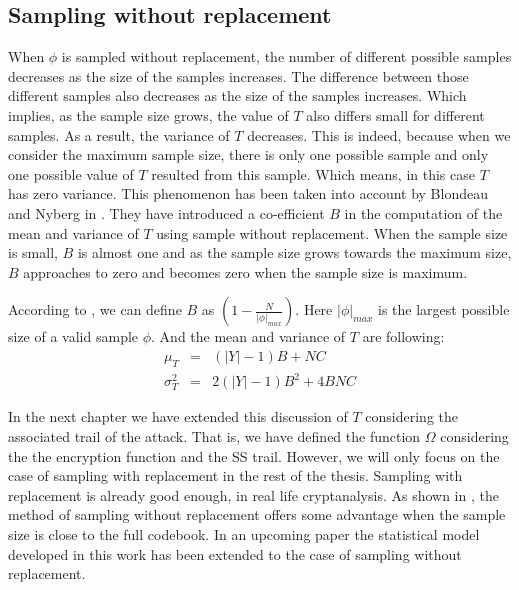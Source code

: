 \subsection{Sampling without replacement} \label{section:sampling_without_replacement}
When $\phi$ is sampled without replacement, the number of different possible samples decreases as the size of the samples increases. The difference between those different samples also decreases as the size of the samples increases. Which implies, as the sample size grows, the value of $T$ also differs small for different samples. As a result, the variance of $T$ decreases. This is indeed, because when we consider the maximum sample size, there is only one possible sample and only one possible value of $T$ resulted from this sample. Which means, in this case $T$ has zero variance. This phenomenon has been taken into account by Blondeau and Nyberg in \citep{sample_without_replacement}. They have introduced a co-efficient $B$ in the computation of the mean and variance of $T$ using sample without replacement. When the sample size is small, $B$ is almost one and as the sample size grows towards the maximum size, $B$ approaches to zero and becomes zero when the sample size is maximum. \par \noindent According to \citep{sample_without_replacement}, we can define $B$ as $\left(1 - \frac{N}{\lvert \phi \rvert_{max}} \right)$. Here $\lvert \phi \rvert_{max}$ is the largest possible size of a valid sample $\phi$. And the mean and variance of $T$ are following:
\begin{eqnarray}
\mu_T &=& \left(\lvert Y \rvert - 1\right)B + NC \\
\sigma^2_T &=& 2\left(\lvert Y \rvert - 1\right)B^2 + 4BNC
\end{eqnarray} \par \noindent In the next chapter we have extended this discussion of $T$ considering the associated trail of the attack. That is, we have defined the function $\Omega$ considering the the encryption function and the SS trail. However, we will only focus on the case of sampling with replacement in the rest of the thesis. Sampling with replacement is already good enough, in real life cryptanalysis. As shown in \citep{sample_without_replacement}, the method of sampling without replacement offers some advantage when the sample size is close to the full codebook. In an upcoming paper \citep{kaisa_mohsin_2015} the statistical model developed in this work has been extended to the case of sampling without replacement.